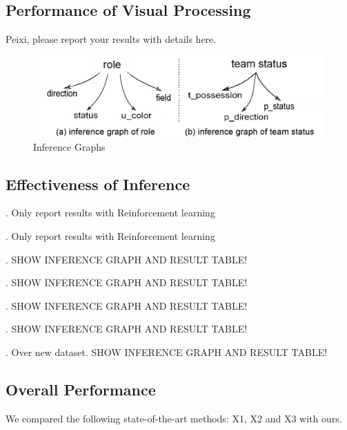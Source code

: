\subsection{Performance of Visual Processing}

{\color{red} Peixi, please report your results with details here.}



\begin{figure}[tb!]
\centering
\includegraphics[width=\columnwidth]{./figure/PredictNB.eps}
\vspace{-2ex}
\caption{Inference Graphs}
\vspace{-2ex}
\label{fig:inferG}
\end{figure}

\subsection{Effectiveness of Inference} 

. Only report results with Reinforcement learning 

. Only report results with Reinforcement learning 

. {\color{red} SHOW INFERENCE GRAPH AND RESULT TABLE!}

. {\color{red} SHOW INFERENCE GRAPH AND RESULT TABLE!}

. {\color{red} SHOW INFERENCE GRAPH AND RESULT TABLE!}

. {\color{red} SHOW INFERENCE GRAPH AND RESULT TABLE!}

. {\color{red} Over new dataset. SHOW INFERENCE GRAPH AND RESULT TABLE!}

\subsection{Overall Performance}
\label{sec-overall-performance}

We compared the following state-of-the-art methods: X1, X2 and X3 with ours. 